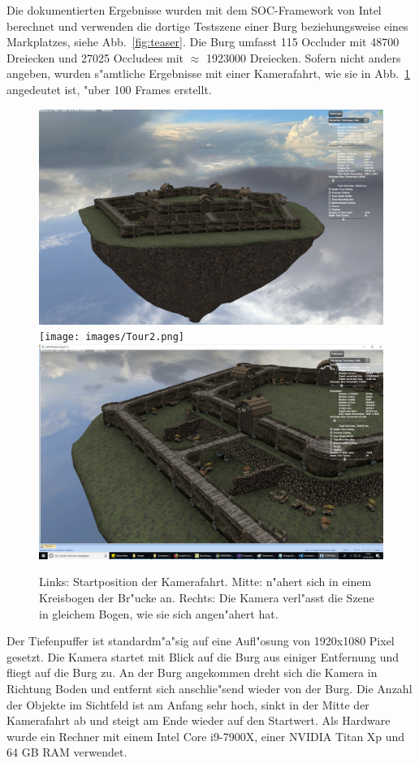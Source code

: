 \documentclass[journal]{vgtc}
\begin{document}
Die dokumentierten Ergebnisse wurden mit dem SOC-Framework von Intel berechnet und verwenden die dortige Testszene einer Burg beziehungsweise eines Markplatzes, siehe Abb.\ \ref{fig:teaser}. Die Burg umfasst 115 Occluder mit 48700 Dreiecken und 27025  Occludees mit $\approx$ 1923000 Dreiecken. Sofern nicht anders angeben, wurden s"amtliche Ergebnisse mit einer Kamerafahrt, wie sie in Abb.\ \ref{fig:fahrt} angedeutet ist, "uber 100 Frames erstellt.
\begin{figure}%
\includegraphics[width=0.33\columnwidth]{images/Tour1.png}%
\texttt{[image: images/Tour2.png]}%
\includegraphics[width=0.33\columnwidth]{images/Tour3.png}%
\caption{Links: Startposition der Kamerafahrt. Mitte: n"ahert sich in einem Kreisbogen der Br"ucke an. Rechts: Die Kamera verl"asst die Szene in gleichem Bogen, wie sie sich angen"ahert hat.}%
\label{fig:fahrt}%
\end{figure}
Der Tiefenpuffer ist standardm"a"sig auf eine Aufl"osung von 1920x1080 Pixel gesetzt. Die Kamera startet mit Blick auf die Burg aus einiger Entfernung und fliegt auf die Burg zu. An der Burg angekommen dreht sich die Kamera in Richtung Boden und entfernt sich anschlie"send wieder von der Burg. Die Anzahl der Objekte im Sichtfeld ist am Anfang sehr hoch, sinkt in der Mitte der Kamerafahrt ab und steigt am Ende wieder auf den Startwert. Als Hardware wurde ein Rechner mit einem Intel Core i9-7900X, einer NVIDIA Titan Xp und 64 GB RAM verwendet.
\end{document}
